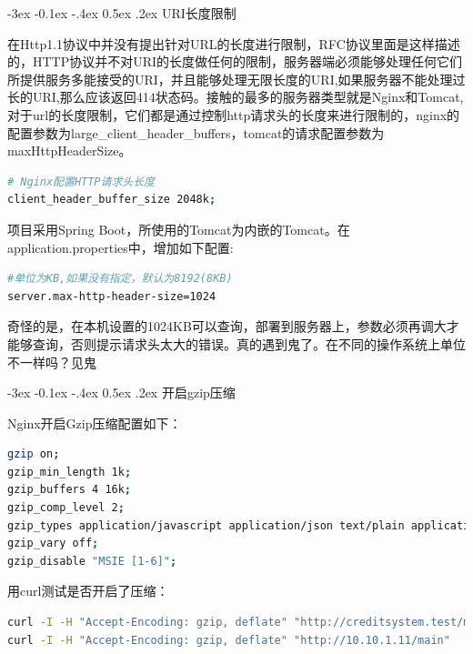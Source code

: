 \documentclass[12pt]{book}
\makeatletter
\numberwithin{dummy}{section}
\theoremstyle{ocrenumbox}
\theoremstyle{blacknumex}
\theoremstyle{blacknumbox}
\theoremstyle{ocrenum}
\renewcommand{\subsection}{\@startsection {subsection}{2}{\z@}
	{-3ex \@plus -0.1ex \@minus -.4ex}
	{0.5ex \@plus.2ex }
	{\normalfont\sffamily\bfseries}}
\makeatother
\begin{document}
\subsection{URI长度限制}

在Http1.1协议中并没有提出针对URL的长度进行限制，RFC协议里面是这样描述的，HTTP协议并不对URI的长度做任何的限制，服务器端必须能够处理任何它们所提供服务多能接受的URI，并且能够处理无限长度的URI,如果服务器不能处理过长的URI,那么应该返回414状态码。接触的最多的服务器类型就是Nginx和Tomcat,对于url的长度限制，它们都是通过控制http请求头的长度来进行限制的，nginx的配置参数为large\_client\_header\_buffers，tomcat的请求配置参数为maxHttpHeaderSize。

\begin{lstlisting}[language=bash]
# Nginx配置HTTP请求头长度
client_header_buffer_size 2048k;
\end{lstlisting}

项目采用Spring Boot，所使用的Tomcat为内嵌的Tomcat。在application.properties中，增加如下配置:

\begin{lstlisting}[language=bash]
#单位为KB,如果没有指定，默认为8192(8KB)
server.max-http-header-size=1024
\end{lstlisting}

奇怪的是，在本机设置的1024KB可以查询，部署到服务器上，参数必须再调大才能够查询，否则提示请求头太大的错误。真的遇到鬼了。在不同的操作系统上单位不一样吗？见鬼

\subsection{开启gzip压缩}

Nginx开启Gzip压缩配置如下：

\begin{lstlisting}[language=Bash]
gzip on;
gzip_min_length 1k;
gzip_buffers 4 16k;
gzip_comp_level 2;
gzip_types application/javascript application/json text/plain application/x-javascript text/css application/xml text/javascript application/x-httpd-php image/jpeg image/gif image/png;
gzip_vary off;
gzip_disable "MSIE [1-6]";
\end{lstlisting}

用curl测试是否开启了压缩：

\begin{lstlisting}[language=Bash]
curl -I -H "Accept-Encoding: gzip, deflate" "http://creditsystem.test/main"
curl -I -H "Accept-Encoding: gzip, deflate" "http://10.10.1.11/main"
\end{lstlisting}
\end{document}
